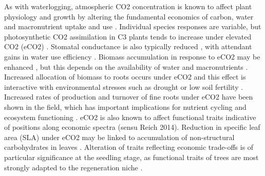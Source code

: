 \documentclass[12pt,a4paper]{memoir}
\begin{document}
As with waterlogging, atmospheric CO2 concentration is known to affect plant physiology and growth by altering the fundamental economics of carbon, water and macronutrient uptake and use \cite{Poorter2003a, Wang2012, Reich2014}.  Individual species responses are variable, but photosynthetic CO2 assimilation in C3 plants tends to increase under elevated CO2 (eCO2) \cite{Curtis1996}. Stomatal conductance is also typically reduced \cite{Ainsworth2007}, with attendant gains in water use efficiency \cite{Holtum2010, Keenan2013, VanderSleen2014}. Biomass accumulation in response to eCO2 may be enhanced \cite{Wang2012}, but this depends on the availability of water and macronutrients \cite{Korner2006, Manea2014, Reich2014}. Increased allocation of biomass to roots occurs under eCO2 \cite{Nie2013} and this effect is interactive with environmental stresses such as drought or low soil fertility \cite{Wang2010}. Increased rates of production and turnover of fine roots under eCO2 have been shown in the field, which has important implications for nutrient cycling and ecosystem functioning \cite{Pregitzer1995, Pregitzer2000, Matamala2000, Lipson2014}. eCO2 is also known to affect functional traits indicative of positions along economic spectra (sensu Reich 2014). Reduction in specific leaf area (SLA) under eCO2 may be linked to accumulation of non-structural carbohydrates in leaves \cite{Poorter2003a, Bader2010}. Alteration of traits reflecting economic trade-offs is of particular significance at the seedling stage, as functional traits of trees are most strongly adapted to the regeneration niche \cite{Poorter2007}.
\end{document}
